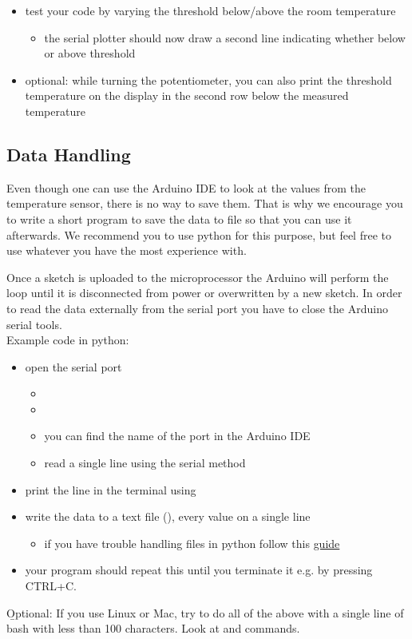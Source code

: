 \begin{itemize}
    	\item test your code by varying the threshold below/above the room temperature
	\begin{itemize}
		\item the serial plotter should now draw a second line indicating whether below or above threshold
 	\end{itemize}
    	\item optional: while turning the potentiometer, you can also print the threshold temperature on the display in the second row below the measured temperature
\end{itemize}

\subsection{Data Handling}\label{sec:data}
Even though one can use the Arduino \ac{IDE} to look at the values from the temperature sensor, there is no way to save them. That is why we encourage you to write a short program to save the data to file so that you can use it afterwards. We recommend you to use python for this purpose, but feel free to use whatever you have the most experience with.\par
Once a sketch is uploaded to the microprocessor the Arduino will perform the loop until it is disconnected from power or overwritten by a new sketch. In order to read the data externally from the serial port you have to close the Arduino serial tools.\\
Example code in python:
\begin{itemize}
	\item open the serial port
	\begin{itemize}
		\item {}
		\item {}
		\item you can find the name of the port in the Arduino \ac{IDE}
		\item read a single line using the serial method   
	\end{itemize}
	\item print the line in the terminal using 
	\item write the data to a text file (), every value on a single line
	\begin{itemize}
		\item if you have trouble handling files in python follow this \href{http://www.pythonforbeginners.com/files/reading-and-writing-files-in-python}{guide}
	\end{itemize}
	\item your program should repeat this until you terminate it e.g. by pressing CTRL+C.
\end{itemize}
\b{Optional}: If you use Linux or Mac, try to do all of the above with a single line of bash with less than 100 characters. Look at  and  commands.

